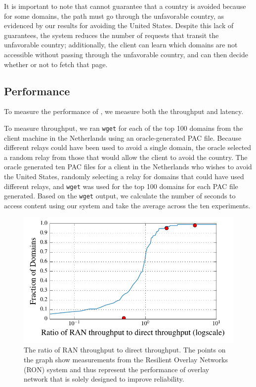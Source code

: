 It is important to note that \system{} cannot guarantee that a country is 
avoided because for some domains, the path must go through the unfavorable 
country, as evidenced by our results for avoiding the United States.  Despite 
this lack of guarantees, the system reduces the number of requests that 
transit the unfavorable country; additionally, the client can learn which domains 
are not accessible without passing through the unfavorable country, and can then 
decide whether or not to fetch that page.  

\subsection{Performance}
To measure the performance of \system{}, we measure both 
the throughput and latency.

To measure throughput, we ran {\tt wget} for each 
of the top 100 domains from the client machine in the Netherlands 
using an oracle-generated PAC file.  Because different relays could have been 
used to avoid a single domain, the oracle selected a random relay from those 
that would allow the client to avoid the country.  The oracle generated 
ten PAC files for a client in the Netherlands who wishes to avoid the United States,
 randomly selecting a relay for domains that could have used 
different relays, and {\tt wget} was used for the top 100 domains for each 
PAC file generated.  Based on the {\tt wget} output, we calculate the number 
of seconds to access content using our system and take the average across the 
ten experiments. 

\begin{figure}[t]
\centering
\includegraphics[width=.5\textwidth]{throughput}
\caption{The ratio of RAN throughput to direct throughput.  
The points on the graph show measurements from the Resilient Overlay
Networks (RON) system and thus represent  the performance of overlay network
that is solely designed to improve reliability.} 
\label{fig:throughput}
\end{figure}

